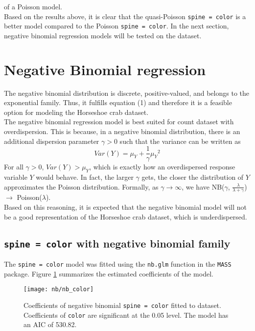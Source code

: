\documentclass[a4paper, 12pt]{article}
\begin{document}
\noindent of a Poisson model. \\
\indent Based on the results above, it is clear that the quasi-Poisson \texttt{spine = color} is a better model compared to the Poisson \texttt{spine = color}. In the next section, negative binomial regression models will be tested on the dataset.

\section{Negative Binomial regression}
The negative binomial distribution is discrete, positive-valued, and belongs to the exponential family. Thus, it fulfills equation (1) and therefore it is a feasible option for modeling the Horseshoe crab dataset. \\
\indent The negative binomial regression model is best suited for count dataset with overdispersion. This is because, in a negative binomial distribution, there is an additional dispersion parameter $\gamma > 0$ such that the variance can be written as 
$$ Var(Y) = \mu_{Y} + \frac{1}{\gamma}{\mu_{Y}}^2$$
For all $\gamma > 0$, $ Var(Y) > \mu_{Y} $, which is exactly how an overdispersed response variable $Y$ would behave. In fact, the larger $\gamma$ gets, the closer the distribution of $Y$ approximates the Poisson distribution. Formally, as $\gamma \to \infty$, we have NB($\gamma$, $\frac{\lambda}{\lambda + \gamma}$) $\to$ Poisson($\lambda$).\\
\indent Based on this reasoning, it is expected that the negative binomial model will not be a good representation of the Horseshoe crab dataset, which is underdispersed. 

\subsection{\texttt{spine = color} with negative binomial family}
The \texttt{spine = color} model was fitted using the \texttt{nb.glm} function in the \texttt{MASS} package. Figure \ref{nb_color} summarizes the estimated coefficients of the model. \\ 

\begin{figure}[H]
\begin{center}
\texttt{[image: nb/nb\_color]}
\caption{Coefficients of negative binomial \texttt{spine = color} fitted to dataset. Coefficients of \texttt{color} are significant at the 0.05 level. The model has an AIC of 530.82.}
\label{nb_color}
\end{center}
\end{figure}
\end{document}
